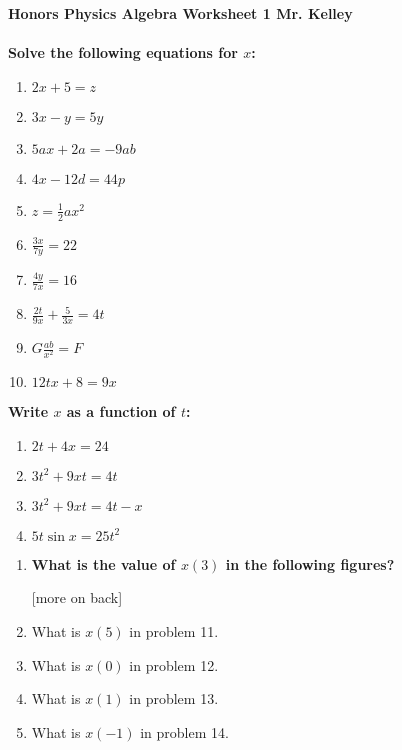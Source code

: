 \documentclass[12pt]{report}
\newcommand{ \probDir}[1]{{ \bf\small #1 \mbox{  }}}
\newcommand{ \breakList}{\setcounter{saveenum}{\value{enumi}} \end{enumerate}}
\newcommand{ \contList}{\begin{enumerate} \setcounter{enumi}{\value{saveenum}}}
\newcounter{saveenum}
\begin{document}
{\bf{Honors Physics} \hfill {Algebra Worksheet 1} \hfill {Mr. Kelley}} \\ \\
\probDir{Solve the following equations for $x$:} \\
\begin{multicols}{3}
\begin{enumerate}
\item $2x + 5 =  z$
\item $3x - y = 5y$
\item $5ax + 2a = -9ab$
\item $4x - 12d = 44p$
\item $z = \frac{1}{2}ax^2$
\item $\frac{3x}{7y} = 22$
\item $\frac{4y}{7x} = 16$
\item $\frac{2t}{9x} + \frac{5}{3x} = 4t$
\item $G\frac{ab}{x^2} = F$
\item $12tx + 8 = 9x$
\breakList
\end{multicols}
\probDir{Write $x$ as a function of $t$:}
\begin{multicols}{2}
\contList
\item $2t + 4x = 24$
\item $3t^2 + 9xt = 4t$
\item $3t^2 + 9xt = 4t -x$
\item $5t \sin x = 25 t^2$	
\breakList
\end{multicols}

\contList
\item \probDir{What is the value of $x(3)$ in the following figures?}


\begin{figure}[h]
\centering
{}
\setcounter{subfigure}{0}
\end{figure}

[more on back]

\pagebreak

\item What is $x(5)$ in problem 11.
\item What is $x(0)$ in problem 12.
\item What is $x(1)$ in problem 13.
\item What is $x(-1)$ in problem 14.


\end{enumerate}
\end{document}
